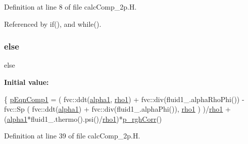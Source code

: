 Definition at line 8 of file calc\+Comp\+\_\+2p.\+H.



Referenced by if(), and while().

\mbox{\label{calcComp__2p_8H_a0544c3fe466e421738dae463968b70ba}} 
\subsubsection{\texorpdfstring{else}{else}}
{\footnotesize\ttfamily else}

{\bfseries Initial value\+:}
\begin{DoxyCode}
\{
    \hyperlink{calcComp__2p_8H_a92a3a7292cb18de09b0b1a96a1f5b324}{pEqnComp1} =
        (
            fvc::ddt(\hyperlink{alphaEqns__2p_8H_a9cf7e208292359f8f667534601eac83c}{alpha1}, \hyperlink{updatePP__rghRho__2p_8H_afa544c227ef35756c30d930109636746}{rho1})
        +   fvc::div(fluid1\_.alphaRhoPhi())
        -   fvc::Sp
            (
                fvc::ddt(\hyperlink{alphaEqns__2p_8H_a9cf7e208292359f8f667534601eac83c}{alpha1}) 
            +   fvc::div(fluid1\_.alphaPhi()), 
                \hyperlink{updatePP__rghRho__2p_8H_afa544c227ef35756c30d930109636746}{rho1}
            )
        )/\hyperlink{updatePP__rghRho__2p_8H_afa544c227ef35756c30d930109636746}{rho1}
    +   (\hyperlink{alphaEqns__2p_8H_a9cf7e208292359f8f667534601eac83c}{alpha1}*fluid1\_.thermo().psi()/\hyperlink{updatePP__rghRho__2p_8H_afa544c227ef35756c30d930109636746}{rho1})*\hyperlink{calcComp__2p_8H_ab1e251844951abf5ef1f64a043473baf}{p\_rghCorr}()
\end{DoxyCode}


Definition at line 39 of file calc\+Comp\+\_\+2p.\+H.

